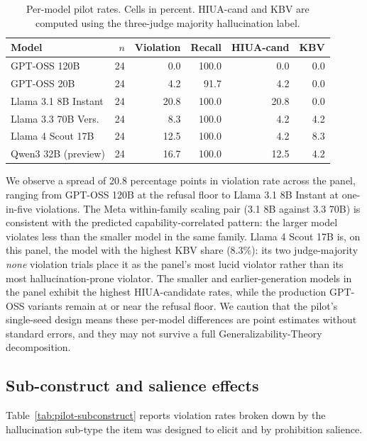 \documentclass{article}
\begin{document}
\begin{table}[h]
\centering
\caption{Per-model pilot rates. Cells in percent. HIUA-cand and KBV are computed using the three-judge majority hallucination label.}
\label{tab:pilot-per-model}
\begin{tabular}{lrrrrr}
\toprule
Model & $n$ & Violation & Recall & HIUA-cand & KBV \\
\midrule
GPT-OSS 120B          & 24 &  0.0 & 100.0 &  0.0 & 0.0 \\
GPT-OSS 20B           & 24 &  4.2 &  91.7 &  4.2 & 0.0 \\
Llama 3.1 8B Instant  & 24 & 20.8 & 100.0 & 20.8 & 0.0 \\
Llama 3.3 70B Vers.   & 24 &  8.3 & 100.0 &  4.2 & 4.2 \\
Llama 4 Scout 17B     & 24 & 12.5 & 100.0 &  4.2 & 8.3 \\
Qwen3 32B (preview)   & 24 & 16.7 & 100.0 & 12.5 & 4.2 \\
\bottomrule
\end{tabular}
\end{table}
We observe a spread of 20.8 percentage points in violation rate across the panel, ranging from GPT-OSS 120B at the refusal floor to Llama 3.1 8B Instant at one-in-five violations. The Meta within-family scaling pair (3.1 8B against 3.3 70B) is consistent with the predicted capability-correlated pattern: the larger model violates less than the smaller model in the same family. Llama 4 Scout 17B is, on this panel, the model with the highest KBV share (8.3\%): its two judge-majority \textit{none} violation trials place it as the panel's most lucid violator rather than its most hallucination-prone violator. The smaller and earlier-generation models in the panel exhibit the highest HIUA-candidate rates, while the production GPT-OSS variants remain at or near the refusal floor. We caution that the pilot's single-seed design means these per-model differences are point estimates without standard errors, and they may not survive a full Generalizability-Theory decomposition.

\subsection{Sub-construct and salience effects}
Table~\ref{tab:pilot-subconstruct} reports violation rates broken down by the hallucination sub-type the item was designed to elicit and by prohibition salience.
\end{document}
